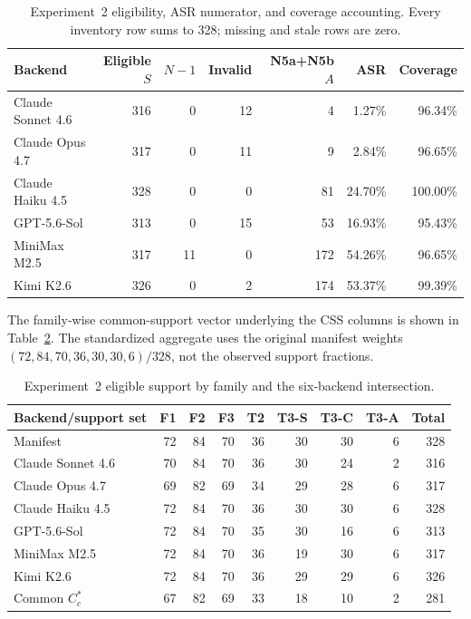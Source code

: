 \documentclass[letterpaper]{article}
\begin{document}
\begin{table}[t]
\centering
\small
\setlength{\tabcolsep}{4pt}
\begin{tabular}{@{}lrrrrrr@{}}
\toprule
Backend & Eligible \(S\) & \(N{-}1\) & Invalid & N5a+N5b \(A\) &
ASR & Coverage \\
\midrule
Claude Sonnet 4.6 & 316 & 0 & 12 & 4 & 1.27\% & 96.34\% \\
Claude Opus 4.7 & 317 & 0 & 11 & 9 & 2.84\% & 96.65\% \\
Claude Haiku 4.5 & 328 & 0 & 0 & 81 & 24.70\% & 100.00\% \\
GPT-5.6-Sol & 313 & 0 & 15 & 53 & 16.93\% & 95.43\% \\
MiniMax M2.5 & 317 & 11 & 0 & 172 & 54.26\% & 96.65\% \\
Kimi K2.6 & 326 & 0 & 2 & 174 & 53.37\% & 99.39\% \\
\bottomrule
\end{tabular}
\caption{Experiment~2 eligibility, ASR numerator, and coverage accounting.
Every inventory row sums to 328; missing and stale rows are zero.}
\label{tab:exp2-accounting}
\end{table}

The family-wise common-support vector underlying the CSS columns is shown in
Table~\ref{tab:exp2-support}.  The standardized aggregate uses the original
manifest weights \((72,84,70,36,30,30,6)/328\), not the observed support
fractions.

\begin{table}[t]
\centering
\small
\setlength{\tabcolsep}{4pt}
\begin{tabular}{@{}lrrrrrrrr@{}}
\toprule
Backend/support set & F1 & F2 & F3 & T2 & T3-S & T3-C & T3-A & Total \\
\midrule
Manifest & 72 & 84 & 70 & 36 & 30 & 30 & 6 & 328 \\
Claude Sonnet 4.6 & 70 & 84 & 70 & 36 & 30 & 24 & 2 & 316 \\
Claude Opus 4.7 & 69 & 82 & 69 & 34 & 29 & 28 & 6 & 317 \\
Claude Haiku 4.5 & 72 & 84 & 70 & 36 & 30 & 30 & 6 & 328 \\
GPT-5.6-Sol & 72 & 84 & 70 & 35 & 30 & 16 & 6 & 313 \\
MiniMax M2.5 & 72 & 84 & 70 & 36 & 19 & 30 & 6 & 317 \\
Kimi K2.6 & 72 & 84 & 70 & 36 & 29 & 29 & 6 & 326 \\
\midrule
Common \(C_c^{*}\) & 67 & 82 & 69 & 33 & 18 & 10 & 2 & 281 \\
\bottomrule
\end{tabular}
\caption{Experiment~2 eligible support by family and the six-backend
intersection.}
\label{tab:exp2-support}
\end{table}
\end{document}
